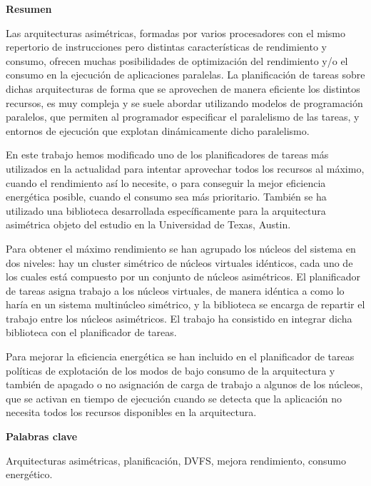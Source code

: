 
\cleardoublepage
\thispagestyle{empty}

\begin{center}
  {\bf \Huge Resumen}
\end{center}

Las arquitecturas asimétricas, formadas por varios procesadores con el
mismo repertorio de instrucciones pero distintas características de
rendimiento y consumo, ofrecen muchas posibilidades de optimización del
rendimiento y/o el consumo en la ejecución de aplicaciones paralelas. La
planificación de tareas sobre dichas arquitecturas de forma que se
aprovechen de manera eficiente los distintos recursos, es muy compleja y se
suele abordar utilizando modelos de programación paralelos, que permiten al
programador especificar el paralelismo de las tareas, y entornos de
ejecución que explotan dinámicamente dicho paralelismo.

En este trabajo hemos modificado uno de los planificadores de tareas más
utilizados en la actualidad para intentar aprovechar todos los recursos al
máximo, cuando el rendimiento así lo necesite, o para conseguir la mejor
eficiencia energética posible, cuando el consumo sea más
prioritario. También se ha utilizado una biblioteca desarrollada
específicamente para la arquitectura asimétrica objeto del estudio en la
Universidad de Texas, Austin.

Para obtener el máximo rendimiento se han agrupado los núcleos del sistema
en dos niveles: hay un cluster simétrico de núcleos virtuales idénticos,
cada uno de los cuales está compuesto por un conjunto de núcleos
asimétricos. El planificador de tareas asigna trabajo a los núcleos
virtuales, de manera idéntica a como lo haría en un sistema multinúcleo
simétrico, y la biblioteca se encarga de repartir el trabajo entre los
núcleos asimétricos. El trabajo ha consistido en integrar dicha biblioteca
con el planificador de tareas.

Para mejorar la eficiencia energética se han incluido en el planificador de
tareas políticas de explotación de los modos de bajo consumo de la
arquitectura y también de apagado o no asignación de carga de trabajo a
algunos de los núcleos, que se activan en tiempo de ejecución cuando se
detecta que la aplicación no necesita todos los recursos disponibles en la
arquitectura.


\begin{center}
  {\bf \Large Palabras clave}
\end{center}
{
\parindent=0in   
Arquitecturas asimétricas, planificación, DVFS, mejora rendimiento, consumo
energético.
}



